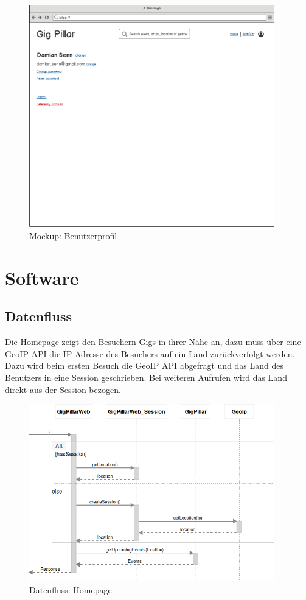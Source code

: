 \begin{figure}[!htb]
  \centering
  \includegraphics[width=0.95\textwidth]{mockups/profile.png}
  \caption{Mockup: Benutzerprofil}
\end{figure}

\clearpage
\section{Software}

\subsection{Datenfluss}

Die Homepage zeigt den Besuchern Gigs in ihrer Nähe an, dazu muss über eine
GeoIP API die IP-Adresse des Besuchers auf ein Land zurückverfolgt werden.
Dazu wird beim ersten Besuch die GeoIP API abgefragt und das Land des Benutzers
in eine Session geschrieben. Bei weiteren Aufrufen wird das Land direkt aus der
Session bezogen.

\begin{figure}[!htb]
  \centering
  \includegraphics[width=0.95\textwidth]{konzept/datenfluss-homepage.png}
  \caption{Datenfluss: Homepage}
\end{figure}

